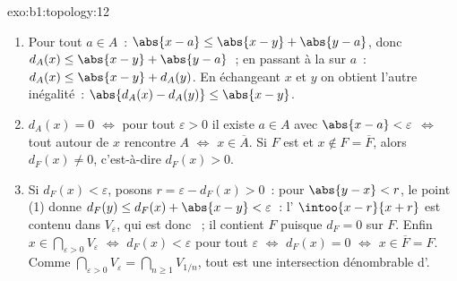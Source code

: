 \begin{solution}{exo:b1:topology:12}
\begin{enumerate}
  \item Pour tout $a \in A$~: $\abs{x - a} \leq \abs{x - y} +
        \abs{y - a}$, donc $d_A(x) \leq \abs{x - y} + \abs{y - a}$~;
        en passant à la  sur $a$~: $d_A(x) \leq
        \abs{x - y} + d_A(y)$. En échangeant $x$ et $y$ on obtient
        l'autre inégalité~: $\abs{d_A(x) - d_A(y)} \leq \abs{x - y}$.
  \item $d_A(x) = 0$ $\iff$ pour tout $\varepsilon > 0$ il existe
        $a \in A$ avec $\abs{x - a} < \varepsilon$ $\iff$ tout
         autour de $x$ rencontre $A$ $\iff$ $x \in \overline A$.
        Si $F$ est  et $x \notin F = \overline F$, alors
        $d_F(x) \neq 0$, c'est-à-dire $d_F(x) > 0$.
  \item Si $d_F(x) < \varepsilon$, posons $r = \varepsilon -
        d_F(x) > 0$~: pour $\abs{y - x} < r$, le point (1) donne
        $d_F(y) \leq d_F(x) + \abs{x - y} < \varepsilon$~:
        l' $\intoo{x - r}{x + r}$ est contenu dans
        $V_\varepsilon$, qui est donc ~; il contient $F$
        puisque $d_F = 0$ sur $F$. Enfin $x \in
        \bigcap_{\varepsilon>0} V_\varepsilon$ $\iff$ $d_F(x) <
        \varepsilon$ pour tout $\varepsilon$ $\iff$ $d_F(x) = 0$
        $\iff$ $x \in \overline F = F$. Comme
        $\bigcap_{\varepsilon > 0} V_\varepsilon =
        \bigcap_{n \geq 1} V_{1/n}$, tout  est une
        intersection dénombrable d'.
\end{enumerate}
\end{solution}

